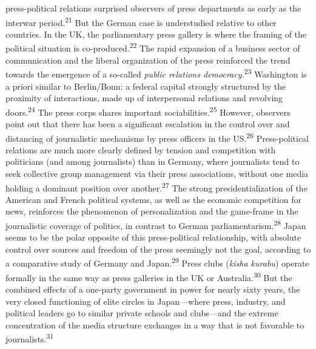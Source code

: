 \documentclass{tufte-handout}
\begin{document}
press-political relations surprised observers of press departments as
early as the interwar period.\textsuperscript{21} But the German case is understudied
relative to other countries. In the UK, the parliamentary press gallery
is where the framing of the political situation is
co-produced.\textsuperscript{22} The rapid expansion of a
business sector of communication and the liberal organization of the
press reinforced the trend towards the emergence of a so-called
\emph{public relations democracy.}\textsuperscript{23} Washington
is a priori similar to Berlin/Bonn: a federal capital strongly
structured by the proximity of interactions, made up of interpersonal
relations and revolving doors.\textsuperscript{24} The
press corps shares important sociabilities.\textsuperscript{25} However, observers point out that
there has been a significant escalation in the control over and
distancing of journalistic mechanisms by press officers in the
US.\textsuperscript{26} Press-political relations are much more
clearly defined by tension and competition with politicians (and among
journalists) than in Germany, where journalists tend to seek collective
group management via their press associations, without one media holding
a dominant position over another.\textsuperscript{27} The strong
presidentialization of the American and French political systems, as
well as the economic competition for news, reinforces the phenomenon of
personalization and the game-frame in the journalistic coverage of
politics, in contrast to German parliamentarism.\textsuperscript{28} Japan seems to be
the polar opposite of this press-political relationship, with absolute
control over sources and freedom of the press seemingly not the goal,
according to a comparative study of Germany and Japan.\textsuperscript{29} Press clubs
(\emph{kisha kurabu}) operate formally in the same way as press
galleries in the UK or Australia.\textsuperscript{30} But
the combined effects of a one-party government in power for nearly sixty
years, the very closed functioning of elite circles in Japan---where
press, industry, and political leaders go to similar private schools and
clubs---and the extreme concentration of the media structure exchanges
in a way that is not favorable to journalists.\textsuperscript{31}
\end{document}
